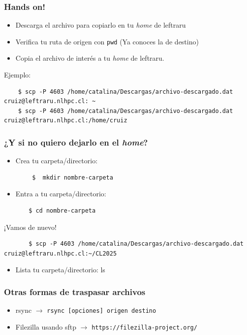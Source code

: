 \documentclass[aspectratio=169,professionalfonts]{beamer}
\begin{document}
\begin{frame}[fragile]
\frametitle{\textbf{Hands on!}}
\begin{itemize}
    \item  Descarga el archivo para copiarlo en tu \textit{home} de leftraru
    \item Verifica tu ruta de origen con \texttt{pwd} (Ya conoces la de destino) 
    \item     Copia el archivo de interés a tu \textit{home} de leftraru.
\end{itemize}
Ejemplo: \\
\begin{verbatim}
    $ scp -P 4603 /home/catalina/Descargas/archivo-descargado.dat cruiz@leftraru.nlhpc.cl: ~
    $ scp -P 4603 /home/catalina/Descargas/archivo-descargado.dat cruiz@leftraru.nlhpc.cl:/home/cruiz
\end{verbatim}
\end{frame}



\begin{frame}[fragile]
\frametitle{\textbf{¿Y si no quiero dejarlo en el \textit{home}?}}
\begin{itemize}
    \item Crea tu carpeta/directorio:
    \end{itemize}
    \begin{verbatim}
        $  mkdir nombre-carpeta
    \end{verbatim}
   \begin{itemize}
       \item Entra a tu carpeta/directorio:
   \end{itemize}
   \begin{verbatim}
       $ cd nombre-carpeta
   \end{verbatim}
    ¡Vamos de nuevo!
   \begin{verbatim}
       $ scp -P 4603 /home/catalina/Descargas/archivo-descargado.dat cruiz@leftraru.nlhpc.cl:~/CL2025
   \end{verbatim}
   \begin{itemize}
       \item Lista tu carpeta/directorio: ls 
   \end{itemize}
       
\end{frame}

\begin{frame}[fragile]
\frametitle{\textbf{Otras formas de traspasar archivos}}
\begin{itemize}
    \item rsync $\rightarrow$ \texttt{rsync [opciones] origen destino}
    \vspace{0.5em} 
    \item Filezilla usando sftp $\rightarrow$ {\color{blue} \scriptsize \texttt{https://filezilla-project.org/}}
    \end{itemize}
    
\end{frame}
\end{document}
